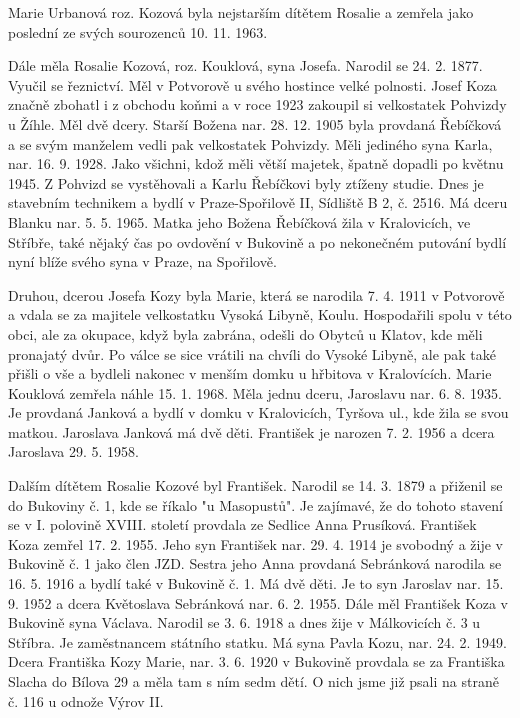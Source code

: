 \documentclass[../dejiny-rodu-prusiku.tex]{subfiles}
\begin{document}
Marie Urbanová roz. Kozová byla nejstarším dítětem Rosa­lie a zemřela jako poslední ze svých sourozenců 10. 11. 1963.

Dále měla Rosalie Kozová, roz. Kouklová, syna Josefa. Narodil se 24. 2. 1877. Vyučil se řeznictví. Měl v Potvo­rově u svého hostince velké polnosti. Josef Koza znač­ně zbohatl i z obchodu koňmi a v roce 1923 zakoupil si velkostatek Pohvizdy u Žíhle. Měl dvě dcery. Starší Božena nar. 28. 12. 1905 byla provdaná Řebíčková a se svým manželem vedli pak velkostatek Pohvizdy. Měli jediného syna Karla, nar. 16. 9. 1928. Jako všichni, kdož měli vět­ší majetek, špatně dopadli po květnu 1945. Z Pohvizd se vystěhovali a Karlu Řebíčkovi byly ztíženy studie. Dnes je stavebním technikem a bydlí v Praze-Spořilově II, Sídliště B 2, č. 2516. Má dceru Blanku nar. 5. 5. 1965. Matka jeho Božena Řebíčková žila v Kralovicích, ve Stříbře, také nějaký čas po ovdovění v Bukovině a po nekonečném putování bydlí nyní blíže svého syna v Pra­ze, na Spořilově.

Druhou, dcerou Josefa Kozy byla Marie, která se narodi­la 7. 4. 1911 v Potvorově a vdala se za majitele velkostat­ku Vysoká Libyně, Koulu. Hospodařili spolu v této obci, ale za okupace, když byla zabrána, odešli do Obytců u Klatov,  kde měli pronajatý dvůr. Po válce se sice vrátili na chvíli do Vysoké Libyně, ale pak také přišli o vše a bydleli nakonec v menším domku u hřbitova v Kra­lovících. Marie Kouklová zemřela náhle 15. 1. 1968. Měla jednu dceru, Jaroslavu nar. 6. 8. 1935. Je provdaná Janko­vá a bydlí v domku v Kralovicích, Tyršova ul., kde žila se svou matkou. Jaroslava Janková má dvě děti. František je narozen 7. 2. 1956 a dcera Jaroslava 29. 5. 1958.

Dalším dítětem Rosalie Kozové byl František. Narodil se 14. 3. 1879 a přiženil se do Bukoviny č. 1, kde se říkalo "u Masopustů". Je zajímavé, že do tohoto stave­ní se v I. polovině XVIII. století provdala ze Sedlice Anna Prusíková. František Koza zemřel 17. 2. 1955. Jeho syn František nar. 29. 4. 1914 je svobodný a žije v Bukovině č. 1 jako člen JZD. Sestra jeho Anna provdaná Sebránková narodila se 16. 5. 1916 a bydlí také v Buko­vině č. 1. Má dvě děti. Je to syn Jaroslav nar. 15. 9. 1952 a dcera Květoslava Sebránková nar. 6. 2. 1955. Dále měl František Koza v Bukovině syna Václava. Narodil se 3. 6. 1918 a dnes žije v Málkovicích č. 3 u Stříbra. Je zaměstnancem státního statku. Má syna Pavla Kozu, nar. 24. 2. 1949. Dcera Františka Kozy Marie, nar. 3. 6. 1920 v Bukovině provdala se za Františka Slacha do Bílova 29 a měla tam s ním sedm dětí. O nich jsme již psali na straně č. 116 u odnože Výrov II.
\end{document}
